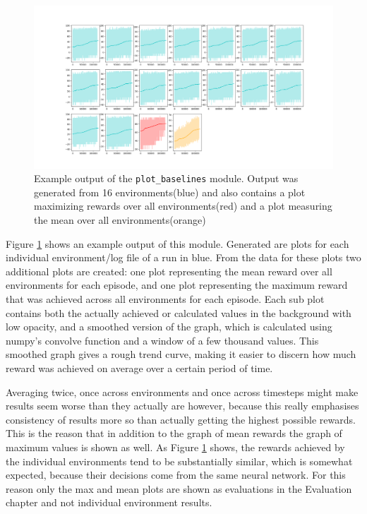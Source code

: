 \begin{figure}[htb]
  \centering
      \includegraphics[width=1\textwidth]{Figures/plot_example_preview.png}
  \caption{Example output of the \lstinline{plot_baselines} module. Output was generated from 16 environments(blue) and also contains a plot maximizing rewards over all environments(red) and a plot measuring the mean over all environments(orange) }
	\label{fig:plot_example}
\end{figure}

Figure \ref{fig:plot_example} shows an example output of this module. Generated are plots for each individual environment/log file of a run in blue. From the data for these plots two additional plots are created: one plot representing the mean reward over all environments for each episode, and one plot representing the maximum reward that was achieved across all environments for each episode. Each sub plot contains both the actually achieved or calculated values in the background with low opacity, and a smoothed version of the graph, which is calculated using numpy's convolve function and a window of a few thousand values. This smoothed graph gives a rough trend curve, making it easier to discern how much reward was achieved on average over a certain period of time. 

Averaging twice, once across environments and once across timesteps might make results seem worse than they actually are however, because this really emphasises consistency of results more so than actually getting the highest possible rewards. This is the reason that in addition to the graph of mean rewards the graph of maximum values is shown as well. As Figure \ref{fig:plot_example} shows, the rewards achieved by the individual environments tend to be substantially similar, which is somewhat expected, because their decisions come from the same neural network. For this reason only the max and mean plots are shown as evaluations in the Evaluation chapter and not individual environment results. 

